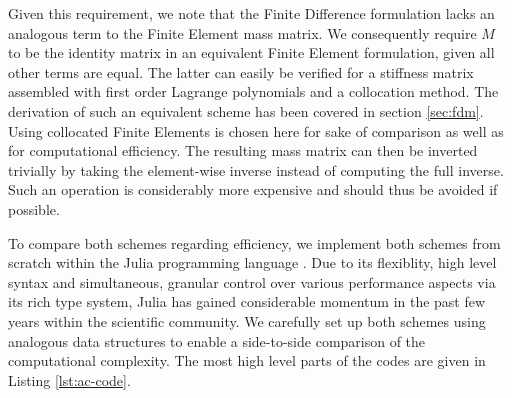 \documentclass[sn-mathphys,Numbered]{sn-jnl}%
\theoremstyle{thmstyleone}%
\theoremstyle{thmstyletwo}%
\theoremstyle{thmstylethree}%
\begin{document}
Given this requirement, we note that the Finite Difference formulation lacks an analogous term to the Finite Element mass matrix. 
We consequently require $M$ to be the identity matrix in an equivalent Finite Element formulation, given all other terms are equal.
The latter can easily be verified for a stiffness matrix assembled with first order Lagrange polynomials and a collocation method.
The derivation of such an equivalent scheme has been covered in section \ref{sec:fdm}.
Using collocated Finite Elements is chosen here for sake of comparison as well as for computational efficiency.
The resulting mass matrix can then be inverted trivially by taking the element-wise inverse instead of computing the full inverse.
Such an operation is considerably more expensive and should thus be avoided if possible.

To compare both schemes regarding efficiency, we implement both schemes from scratch within the Julia programming language \cite{bezansonJuliaFreshApproach2017}.
Due to its flexiblity, high level syntax and simultaneous, granular control over various performance aspects via its rich type system, Julia has gained considerable momentum in the past few years within the scientific community.
We carefully set up both schemes using analogous data structures to enable a side-to-side comparison of the computational complexity.
The most high level parts of the codes are given in Listing \ref{lst:ac-code}.
\end{document}

